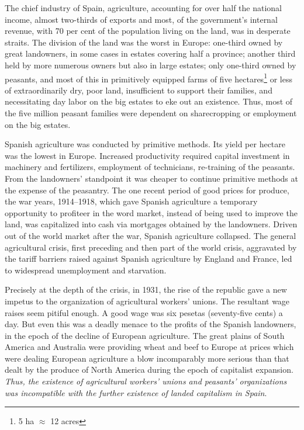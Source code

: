 The chief industry of Spain, agriculture, accounting for over half the national income, almost two-thirds of exports and most, of the government’s internal revenue, with 70 per cent of the population living on the land, was in desperate straits. The division of the land was the worst in Europe: one-third owned by great landowners, in some cases in estates covering half a province; another third held by more numerous owners but also in large estates; only one-third owned by peasants, and most of this in primitively equipped farms of five hectares\footnote{5 ha \( \approx \) 12 acres} or less of extraordinarily dry, poor land, insufficient to support their families, and necessitating day labor on the big estates to eke out an existence. Thus, most of the five million peasant families were dependent on sharecropping or employment on the big estates.

Spanish agriculture was conducted by primitive methods. Its yield per hectare was the lowest in Europe. Increased productivity required capital investment in machinery and fertilizers, employment of technicians, re-training of the peasants. From the landowners’ standpoint it was cheaper to continue primitive methods at the expense of the peasantry. The one recent period of good prices for produce, the war years, 1914--1918, which gave Spanish agriculture a temporary opportunity to profiteer in the word market, instead of being used to improve the land, was capitalized into cash via mortgages obtained by the landowners. Driven out of the world market after the war, Spanish agriculture collapsed. The general agricultural crisis, first preceding and then part of the world crisis, aggravated by the tariff barriers raised against Spanish agriculture by England and France, led to widespread unemployment and starvation.

Precisely at the depth of the crisis, in 1931, the rise of the republic gave a new impetus to the organization of agricultural workers’ unions. The resultant wage raises seem pitiful enough. A good wage was six pesetas (seventy-five cents) a day. But even this was a deadly menace to the profits of the Spanish landowners, in the epoch of the decline of European agriculture. The great plains of South America and Australia were providing wheat and beef to Europe at prices which were dealing European agriculture a blow incomparably more serious than that dealt by the produce of North America during the epoch of capitalist expansion. \emph{Thus, the existence of agricultural workers’ unions and peasants’ organizations was incompatible with the further existence of landed capitalism in Spain}.

